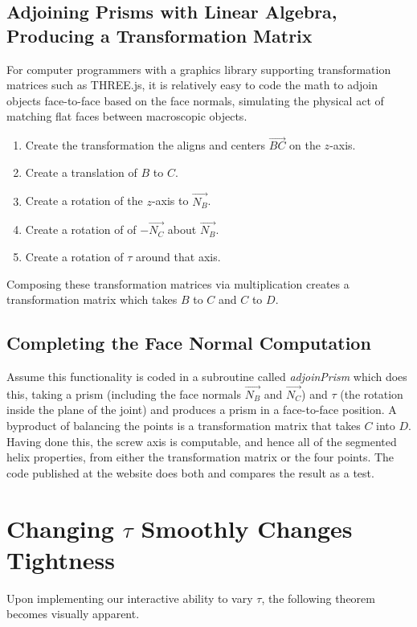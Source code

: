 \documentclass[11pt]{article}
\begin{document}
{\subsection{Adjoining Prisms with Linear Algebra, Producing a Transformation Matrix}
\label{sec:adjoin}

For computer programmers with a graphics library supporting transformation matrices such
as THREE.js\cite{dirksen2013learning},
it is relatively easy to code the math to adjoin objects
face-to-face based on the face normals, simulating the physical act of
matching flat faces between macroscopic objects.
\begin{enumerate}
  \item Create the transformation the aligns and centers $\overrightarrow{BC}$ on the $z$-axis.
\item Create a translation of $B$ to $C$.
\item Create a rotation of the $z$-axis to  $\overrightarrow{N_B}$.
\item Create a rotation of of $-\overrightarrow{N_C}$ about $\overrightarrow{N_B}$.
  \item Create a rotation of $\tau$ around that axis.
\end{enumerate}
Composing these transformation matrices via multiplication creates a
transformation matrix which takes $B$ to $C$ and $C$ to $D$.

\subsection{Completing the Face Normal Computation}
Assume this functionality
is coded in a subroutine called {\em adjoinPrism} which does this, taking a prism
(including the face normals $\overrightarrow{N_B}$ and $\overrightarrow{N_C}$) and $\tau$
(the rotation inside the plane of the joint) and produces a prism
in a face-to-face position. A byproduct
of balancing the points is a transformation matrix
that takes $C$ into $D$. Having done this, the screw axis is computable,
and hence all of the segmented helix properties,
from either the transformation matrix or the four points.
The code published at the website does both and compares the result as a test.

\section{Changing $\tau$ Smoothly Changes Tightness}

Upon implementing our interactive ability to vary $\tau$, the following
theorem becomes visually apparent.

}
\end{document}
